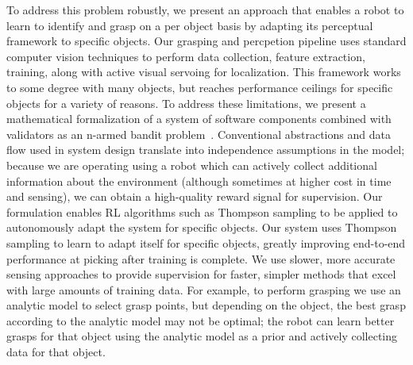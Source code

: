 \documentclass{article}
\begin{document}
To address this problem robustly, we present an approach that enables
a robot to learn to identify and grasp on a per object basis by
adapting its perceptual framework to specific objects. Our grasping
and percpetion pipeline uses standard computer vision techniques to
perform data collection, feature extraction, training, along with
active visual servoing for localization.  This framework works to some
degree with many objects, but reaches performance ceilings for
specific objects for a variety of reasons.  To address these
limitations, we present a mathematical formalization of a system of
software components combined with validators as an n-armed bandit
problem~\citep{thompson33}.  Conventional abstractions and data flow
used in system design translate into independence assumptions in the
model; because we are operating using a robot which can actively
collect additional information about the environment (although
sometimes at higher cost in time and sensing), we can obtain a
high-quality reward signal for supervision.  Our formulation enables
RL algorithms such as Thompson sampling to be applied to autonomously
adapt the system for specific objects.  Our system uses Thompson
sampling to learn to adapt itself for specific objects, greatly
improving end-to-end performance at picking after training is
complete.  We use slower, more accurate sensing approaches to provide
supervision for faster, simpler methods that excel with large amounts
of training data.  For example, to perform grasping we use an analytic
model to select grasp points, but depending on the object, the best
grasp according to the analytic model may not be optimal; the robot
can learn better grasps for that object using the analytic model as a
prior and actively collecting data for that object.




\end{document}
